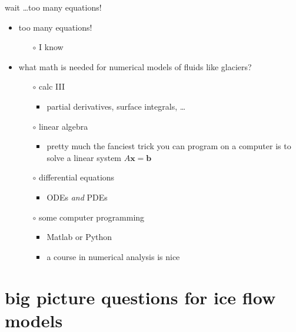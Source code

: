\documentclass[10pt,hyperref={pdfpagelabels=true}]{beamer}
\newcommand{\bb}{\mathbf{b}}
\newcommand{\bx}{\mathbf{x}}
\begin{document}
\begin{frame}{wait \dots too many equations!}

\begin{itemize}
\item too many equations!
    \begin{itemize}
    \item[$\circ$] I know
    \end{itemize}
\item<2> what math is needed for numerical models of fluids like glaciers?
    \begin{itemize}
    \item[$\circ$] calc III
        \begin{itemize}
        \item partial derivatives, surface integrals, \dots
        \end{itemize}
    \item[$\circ$] linear algebra
        \begin{itemize}
        \item pretty much the fanciest trick you can program on a computer is to solve a linear system $A\bx = \bb$
        \end{itemize}
    \item[$\circ$] differential equations
        \begin{itemize}
        \item ODEs \emph{and} PDEs
        \end{itemize}
    \item[$\circ$] some computer programming
        \begin{itemize}
        \item Matlab or Python
        \item a course in numerical analysis is nice
        \end{itemize}
    \end{itemize}
\end{itemize}
\end{frame}


\section[big picture questions]{big picture questions for ice flow models}
\end{document}
